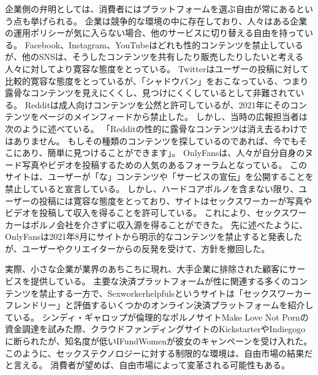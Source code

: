 \documentclass[paper=a4,book,openany]{jlreq} \usepackage{mystyle}
\begin{document}
企業側の弁明としては、消費者にはプラットフォームを選ぶ自由が常にあるという点も挙げられる。
企業は競争的な環境の中に存在しており、人々はある企業の運用ポリシーが気に入らない場合、他のサービスに切り替える自由を持っている。
Facebook、Instagram、YouTubeはどれも性的コンテンツを禁止しているが、他のSNSは、そうしたコンテンツを共有したり販売したりしたいと考える人々に対してより寛容な態度をとっている。
Twitterはユーザーの投稿に対して比較的寛容な態度をとっているが、「シャドウバン」をおこなっている、つまり露骨なコンテンツを見えにくくし、見つけにくくしているとして非難されている\citep{valens20:_repor_says_shadow_is_real}。
Redditは成人向けコンテンツを公然と許可しているが、2021年にそのコンテンツをページのメインフィードから禁止した。
しかし、当時の広報担当者は次のように述べている。
「Redditの性的に露骨なコンテンツは消え去るわけではありません。
もしその種類のコンテンツを探しているのであれば、今でもそこにあり、簡単に見つけることができます」\citep{sosa11:_remov_sexual_explic_conten}。
OnlyFansは、人々が自分自身のヌード写真やビデオを投稿するための人気のあるフォーラムとなっている。
このサイトは、ユーザーが「な」コンテンツや「サービスの宣伝」を公開することを禁止していると宣言している。
しかし、ハードコアポルノを含まない限り、ユーザーの投稿には寛容な態度をとっており、サイトはセックスワーカーが写真やビデオを投稿して収入を得ることを許可している。
これにより、セックスワーカーはポルノ会社を介さずに収入源を得ることができた\citep{bernstein19:_how_onlyf_chang_sex_work_forev}。
先に述べたように、OnlyFansは2021年8月にサイトから明示的なコンテンツを禁止すると発表したが、ユーザーやクリエイターからの反発を受けて、方針を撤回した。

実際、小さな企業が業界のあちこちに現れ、大手企業に排除された顧客にサービスを提供している。
主要な決済プラットフォームが性に関連する多くのコンテンツを禁止する一方で、Sexworkerhelpfulsというサイトは「セックスワーカーフレンドリー」と評価するいくつかのオンライン決済プラットフォームを紹介している\citep{sexworkerhelpfuls.com18:_sex_work_approv_paymen_option}。
シンディ・ギャロップが倫理的なポルノサイトMake Love Not Pornの資金調達を試みた際、クラウドファンディングサイトのKickstarterやIndiegogoに断られたが、知名度が低いIFundWomenが彼女のキャンペーンを受け入れた\citep{gardezi16:_cindy_gallop_journ_normal_dialog_aroun_sex}。
このように、セックステクノロジーに対する制限的な環境は、自由市場の結果だと言える。
消費者が望めば、自由市場によって変革される可能性もある。
\end{document}

